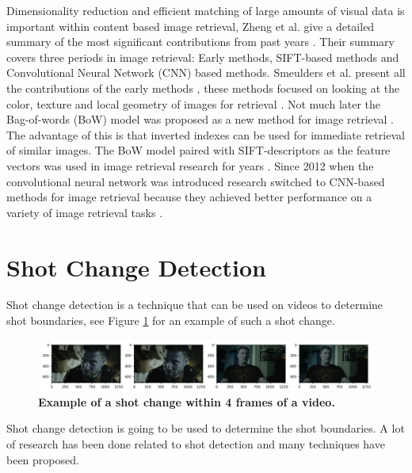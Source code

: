 \documentclass{report}
\begin{document}
Dimensionality reduction and efficient matching of large amounts of visual data is important within content based image retrieval, Zheng et al. give a detailed summary of the most significant contributions from past years \cite{zheng2018sift}. Their summary covers three periods in image retrieval: Early methods, SIFT-based methods and Convolutional Neural Network (CNN) based methods. Smeulders et al. present all the contributions of the early methods \cite{smeulders2000content}, these methods focused on looking at the color, texture and local geometry of images for retrieval \cite{yu2002color,manjunath1996texture}. Not much later the Bag-of-words (BoW) model was proposed as a new method for image retrieval \cite{sivic2003video}. The advantage of this is that inverted indexes can be used for immediate retrieval of similar images. The BoW model paired with SIFT-descriptors \cite{lowe2004distinctive} as the feature vectors was used in image retrieval research for years \cite{nister2006scalable,philbin2007object,jegou2008hamming,jegou2010aggregating,jegou2012aggregating}. Since 2012 when the convolutional neural network was introduced \cite{krizhevsky2012imagenet} research switched to CNN-based methods for image retrieval because they achieved better performance on a variety of image retrieval tasks	 \cite{babenko2014neural,yue2015exploiting, tolias2015particular}.

\section{Shot Change Detection}

Shot change detection is a technique that can be used on videos to determine shot boundaries, see Figure \ref{shotchange} for an example of such a shot change. 

\begin{figure}[H]
	\includegraphics[width=12cm]{images/shotchange.jpg}
	\centering
	\caption{\textbf{Example of a shot change within 4 frames of a video.}}
	\label{shotchange}
\end{figure}

Shot change detection is going to be used to determine the shot boundaries. A lot of research has been done related to shot detection \cite{lienhart1998comparison} and many techniques have been proposed. 
\end{document}
